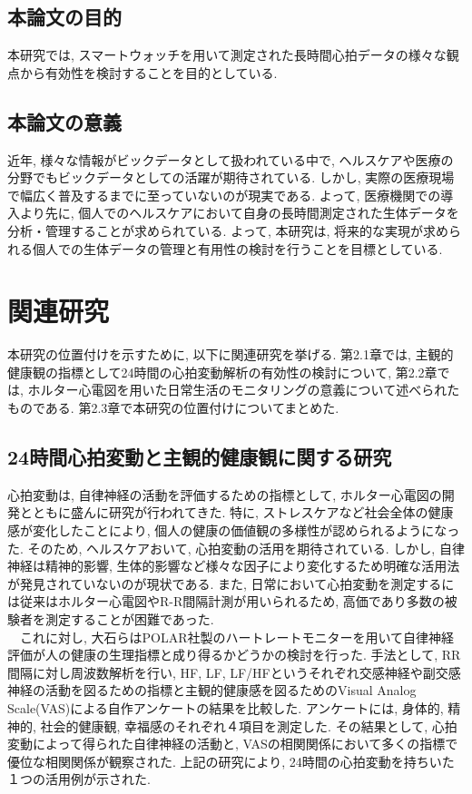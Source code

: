 \documentclass[report, 11pt, a4paper]{jsbook}
\begin{document}
\section{本論文の目的}
本研究では, スマートウォッチを用いて測定された長時間心拍データの様々な観点から有効性を検討することを目的としている. 

\section{本論文の意義}
近年, 様々な情報がビックデータとして扱われている中で, ヘルスケアや医療の分野でもビックデータとしての活躍が期待されている. しかし, 実際の医療現場で幅広く普及するまでに至っていないのが現実である. よって, 医療機関での導入より先に, 個人でのヘルスケアにおいて自身の長時間測定された生体データを分析・管理することが求められている.  
よって, 本研究は, 将来的な実現が求められる個人での生体データの管理と有用性の検討を行うことを目標としている. 


\chapter{関連研究}
本研究の位置付けを示すために, 以下に関連研究を挙げる. 第2.1章では, 主観的健康観の指標として24時間の心拍変動解析の有効性の検討について, 第2.2章では, ホルター心電図を用いた日常生活のモニタリングの意義について述べられたものである. 第2.3章で本研究の位置付けについてまとめた.

\section{24時間心拍変動と主観的健康観に関する研究}
心拍変動は, 自律神経の活動を評価するための指標として, ホルター心電図の開発とともに盛んに研究が行われてきた. 特に, ストレスケアなど社会全体の健康感が変化したことにより, 個人の健康の価値観の多様性が認められるようになった. そのため, ヘルスケアおいて, 心拍変動の活用を期待されている. しかし, 自律神経は精神的影響, 生体的影響など様々な因子により変化するため明確な活用法が発見されていないのが現状である. 
また, 日常において心拍変動を測定するには従来はホルター心電図やR-R間隔計測が用いられるため, 高価であり多数の被験者を測定することが困難であった.\\
~~これに対し, 大石らはPOLAR社製のハートレートモニターを用いて自律神経評価が人の健康の生理指標と成り得るかどうかの検討を行った. 手法として, RR間隔に対し周波数解析を行い, HF, LF, LF/HFというそれぞれ交感神経や副交感神経の活動を図るための指標と主観的健康感を図るためのVisual Analog Scale(VAS)による自作アンケートの結果を比較した. アンケートには, 身体的, 精神的, 社会的健康観, 幸福感のそれぞれ４項目を測定した. その結果として, 心拍変動によって得られた自律神経の活動と, VASの相関関係において多くの指標で優位な相関関係が観察された. 上記の研究により, 24時間の心拍変動を持ちいた１つの活用例が示された. 
\end{document}

